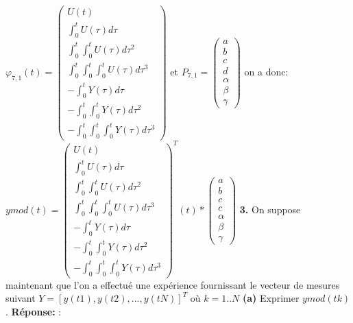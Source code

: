 \documentclass[12pt]{article}
\begin{document}
$
\varphi _{7,1}(t) = 
 \begin{pmatrix}
U(t) \\
\int_{0}^{t} U(\tau) d\tau  \\
\int_{0}^{t} \int_{0}^{t} U(\tau) d\tau ^2 \\
\int_{0}^{t} \int_{0}^{t} \int_{0}^{t} U(\tau) d\tau ^3 \\
-\int_{0}^{t} Y(\tau) d\tau \\
-\int_{0}^{t} \int_{0}^{t} Y(\tau) d\tau ^2 \\
-\int_{0}^{t} \int_{0}^{t} \int_{0}^{t} Y(\tau) d\tau ^3 
\end{pmatrix}
$
et
$
P _{7,1} = 
 \begin{pmatrix}
a \\
b \\
c \\
d\\
\alpha \\
\beta\\
\gamma
\end{pmatrix}
$
\smallbreak
on a donc: $ 
ymod(t)=
\begin{pmatrix}
U(t) \\
\int_{0}^{t} U(\tau) d\tau  \\
\int_{0}^{t} \int_{0}^{t} U(\tau) d\tau ^2 \\
\int_{0}^{t} \int_{0}^{t} \int_{0}^{t} U(\tau) d\tau ^3 \\
-\int_{0}^{t} Y(\tau) d\tau \\
-\int_{0}^{t} \int_{0}^{t} Y(\tau) d\tau ^2 \\
-\int_{0}^{t} \int_{0}^{t} \int_{0}^{t} Y(\tau) d\tau ^3 
\end{pmatrix}^T(t)
*
\begin{pmatrix}
a \\
b \\
c \\
c\\
\alpha \\
\beta\\
\gamma
\end{pmatrix}
$
\medbreak
\textbf{3.} On suppose maintenant que l'on a effectué une expérience fournissant le vecteur de mesures suivant $Y=[y(t1),y(t2),...,y(tN)]^T$ où $k=1..N$ 
\smallbreak
\textbf{(a) } Exprimer $ymod(tk)$.
\smallbreak
\textbf{Réponse:}
\smallbreak:
\end{document}
